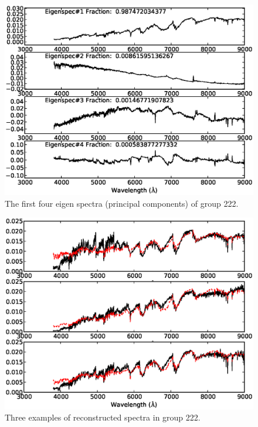 \documentclass[manuscript]{aastex}
\begin{document}
 \begin{figure}
   \centering
   \includegraphics[width=14cm, angle=0,clip]{f74.eps}
   \caption{The first four eigen spectra (principal components) of group 222.
   }
   \label{Fig74}
\end{figure}

 \begin{figure}
   \centering
   \includegraphics[width=14cm, angle=0,clip]{f84.eps}
   \caption{Three examples of reconstructed spectra in group 222.
   }
   \label{Fig84}
\end{figure}
\end{document}
